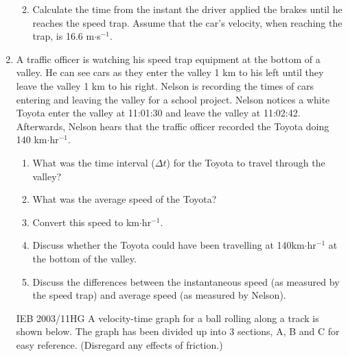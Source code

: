 \begin{enumerate}[noitemsep, label=\textbf{\arabic*}. ]
\begin{enumerate}[noitemsep, label=\textbf{\alph*}. ]
\label{m38796*uid219}\item Calculate the time from the instant the driver applied the brakes until he reaches the speed trap. Assume that the car's velocity, when reaching the trap, is 16.6 m\begin{math}\ensuremath{\cdot}\end{math}s\begin{math}{}^{-1}\end{math}.
\end{enumerate}
                \label{m38796*uid220}\item A traffic officer is watching his speed trap equipment at the bottom of a valley. He can see cars as they enter the valley 1 km to his left until they leave the valley 1 km to his right. Nelson is recording the times of cars entering and leaving the valley for a school project.
Nelson notices a white Toyota enter the valley at 11:01:30 and leave the valley at 11:02:42. Afterwards, Nelson hears that the traffic officer recorded the Toyota doing 140 km\begin{math}\ensuremath{\cdot}\end{math}hr\begin{math}{}^{-1}\end{math}.
\label{m38796*id82652}\begin{enumerate}[noitemsep, label=\textbf{\alph*}. ] 
            \label{m38796*uid221}\item What was the time interval (\begin{math}\Delta t\end{math}) for the Toyota to travel through the valley?
\label{m38796*uid222}\item What was the average speed of the Toyota?
\label{m38796*uid223}\item Convert this speed to km\begin{math}\ensuremath{\cdot}\end{math}hr\begin{math}{}^{-1}\end{math}.
\label{m38796*uid224}\item Discuss whether the Toyota could have been travelling at 140km\begin{math}\ensuremath{\cdot}\end{math}hr\begin{math}{}^{-1}\end{math} at the bottom of the valley.
\label{m38796*uid225}\item Discuss the differences between the instantaneous speed (as measured by the speed trap) and average speed (as measured by Nelson).
\end{enumerate}
                \label{m38796*uid226}\item [IEB 2003/11HG] A velocity-time graph for a ball rolling along a track is shown below. The graph has been divided up into 3 sections, A, B and C for easy reference. (Disregard any effects of friction.)


\end{enumerate}
